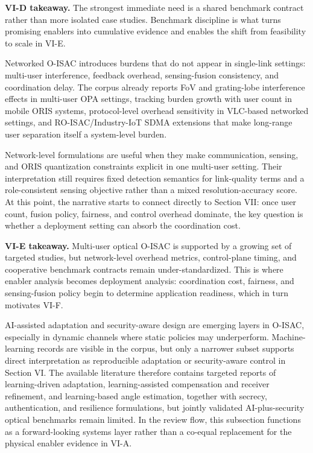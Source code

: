 \documentclass[letterpaper,journal]{IEEEtran}
\begin{document}
\textbf{VI-D takeaway.} The strongest immediate need is a shared benchmark contract rather than more isolated case studies. Benchmark discipline is what turns promising enablers into cumulative evidence and enables the shift from feasibility to scale in VI-E.

Networked O-ISAC introduces burdens that do not appear in single-link settings: multi-user interference, feedback overhead, sensing-fusion consistency, and coordination delay. The corpus already reports FoV and grating-lobe interference effects in multi-user OPA settings, tracking burden growth with user count in mobile ORIS systems, protocol-level overhead sensitivity in VLC-based networked settings, and RO-ISAC/Industry-IoT SDMA extensions that make long-range user separation itself a system-level burden.

Network-level formulations are useful when they make communication, sensing, and ORIS quantization constraints explicit in one multi-user setting. Their interpretation still requires fixed detection semantics for link-quality terms and a role-consistent sensing objective rather than a mixed resolution-accuracy score. At this point, the narrative starts to connect directly to Section VII: once user count, fusion policy, fairness, and control overhead dominate, the key question is whether a deployment setting can absorb the coordination cost.

\textbf{VI-E takeaway.} Multi-user optical O-ISAC is supported by a growing set of targeted studies, but network-level overhead metrics, control-plane timing, and cooperative benchmark contracts remain under-standardized. This is where enabler analysis becomes deployment analysis: coordination cost, fairness, and sensing-fusion policy begin to determine application readiness, which in turn motivates VI-F.

AI-assisted adaptation and security-aware design are emerging layers in O-ISAC, especially in dynamic channels where static policies may underperform. Machine-learning records are visible in the corpus, but only a narrower subset supports direct interpretation as reproducible adaptation or security-aware control in Section VI. The available literature therefore contains targeted reports of learning-driven adaptation, learning-assisted compensation and receiver refinement, and learning-based angle estimation, together with secrecy, authentication, and resilience formulations, but jointly validated AI-plus-security optical benchmarks remain limited. In the review flow, this subsection functions as a forward-looking systems layer rather than a co-equal replacement for the physical enabler evidence in VI-A.
\end{document}
